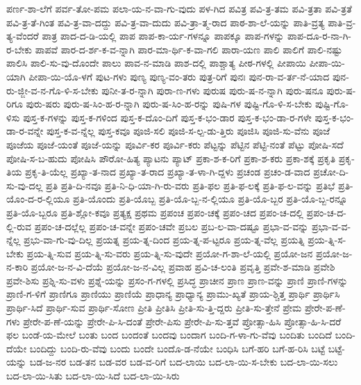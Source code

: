 {ಪರ್ಣ-ಶಾ-ಲೆಗೆ
ಪರ್ವ-ತೋ-ಪಮ
ಪಲಾ-ಯ-ನ-ವಾ-ಗು-ವುದು
ಪಳ-ಗಿದ
ಪವಿತ್ರ
ಪವಿ-ತ್ರ-ತಮ
ಪವಿ-ತ್ರತಾ
ಪವಿ-ತ್ರತೆ
ಪವಿ-ತ್ರ-ತೆ-ಗಿಂತ
ಪವಿ-ತ್ರ-ವಾ-ದದ್ದು
ಪವಿ-ತ್ರ-ವಾ-ದುದು
ಪವಿ-ತ್ರಾ-ತ್ಮ-ರಾದ
ಪಾಠ-ಶಾ-ಲೆ-ಯನ್ನು
ಪಾತಿ-ವ್ರತ್ಯ
ಪಾತಿ-ವ್ರ-ತ್ಯ-ವೆಂದರೆ
ಪಾತ್ರ
ಪಾದ-ದ-ಡಿ-ಯಲ್ಲಿ
ಪಾಪ
ಪಾಪ-ಕಾ-ರ್ಯ-ಗಳನ್ನೂ
ಪಾಪಕ್ಕೂ
ಪಾಪ-ಗಳನ್ನು
ಪಾಪ-ದೂ-ರ-ನಾ-ಗಿ-ರ-ಬೇಕು
ಪಾಪವೆ
ಪಾರ-ದ-ರ್ಶ-ಕ-ವ-ನ್ನಾಗಿ
ಪಾರ-ಮಾ-ರ್ಥಿ-ಕ-ವಾ-ಗಲಿ
ಪಾರಾ-ಯಣ
ಪಾಲಿ
ಪಾಲಿಗೆ
ಪಾಲಿ-ನಷ್ಟು
ಪಾಲಿಸಿ
ಪಾಲಿ-ಸು-ವು-ದೊಂದೇ
ಪಾಲು
ಪಾವ-ನ-ಮಾಡಿ
ಪಾಶ-ದಲ್ಲಿ
ಪಾಶ್ಚಾತ್ಯ
ಪೀಠ-ಗಳಲ್ಲಿ
ಪೀಪಾಯಿ
ಪೀಪಾ-ಯಿ-ಯಾಗಿ
ಪೀಪಾ-ಯಿ-ಯೊ-ಳಗೆ
ಪುಟ-ಗಳು
ಪುಣ್ಯ
ಪುಣ್ಯ-ವಂ-ತರು
ಪುತ್ರ-ರಿಗೆ
ಪುನಃ
ಪುನ-ರಾ-ವ-ರ್ತ-ನೆ-ಯಾದ
ಪುನ-ರು-ಜ್ಜೀ-ವ-ನ-ಗೊ-ಳಿ-ಸ-ಬೇಕು
ಪುನೀ-ತ-ರ-ನ್ನಾಗಿ
ಪುರಾ-ಣ-ಗಳು
ಪುರುಷ
ಪುರು-ಷ-ನ-ನ್ನಾಗಿ
ಪುರು-ಷನೂ
ಪುರು-ಷ-ರಿಗೂ
ಪುರು-ಷರು
ಪುರು-ಷ-ಸಿಂ-ಹ-ರ-ನ್ನಾಗಿ
ಪುರು-ಷ-ಸಿಂ-ಹ-ರನ್ನು
ಪುಷಿ-ಗಳ
ಪುಷ್ಟಿ-ಗೊ-ಳಿ-ಸ-ಬೇಕು
ಪುಷ್ಟಿ-ಗೊ-ಳಿಸು
ಪುಸ್ತ-ಕ-ಗಳನ್ನು
ಪುಸ್ತ-ಕ-ಗಳಿಂದ
ಪುಸ್ತ-ಕ-ದೊಂ-ದಿಗೆ
ಪುಸ್ತ-ಕ-ಭಂ-ಡಾರ
ಪುಸ್ತ-ಕ-ಭಂ-ಡಾ-ರ-ಗಳೇ
ಪುಸ್ತ-ಕ-ಭಂ-ಡಾ-ರ-ವನ್ನೇ
ಪುಸ್ತ-ಕ-ವ-ನ್ನೆಲ್ಲ
ಪುಸ್ತ-ಕವೂ
ಪೂಜಿ-ಸಲಿ
ಪೂಜಿ-ಸ-ಲ್ಪ-ಡು-ತ್ತಿರು
ಪೂಜಿಸಿ
ಪೂಜಿ-ಸು-ವೆನು
ಪೂಜೆ
ಪೂಜೆಯ
ಪೂಜೆ-ಯಂತೆ
ಪೂಜೆ-ಯನ್ನು
ಪೂರ್ವಿ-ಕರ
ಪೂರ್ವಿ-ಕರು
ಪೆಟ್ಟನ್ನು
ಪೆಟ್ಟಿನ
ಪೆಟ್ಟಿ-ನಂತೆ
ಪೆಟ್ಟು
ಪೋಷಿ-ಸದೆ
ಪೋಷಿ-ಸ-ಬ-ಹುದು
ಪೋಷಿಸಿ
ಪೌರೋ-ಹಿತ್ಯ
ಪ್ಯಾಟನು
ಪ್ಯಾಟ್
ಪ್ರಕಾ-ಶ-ಕ-ರಿಗೆ
ಪ್ರಕಾ-ಶ-ಕರು
ಪ್ರಕಾ-ಶಕ್ಕೆ
ಪ್ರಕೃತಿ
ಪ್ರಕೃ-ತಿಯ
ಪ್ರಕೃ-ತಿ-ಯೆಲ್ಲ
ಪ್ರಖ್ಯಾ-ತ-ನಾದ
ಪ್ರಖ್ಯಾ-ತ-ರಾದ
ಪ್ರಖ್ಯಾ-ತ-ಳಾ-ಗಿ-ದ್ದಳು
ಪ್ರಚಂಡ
ಪ್ರಚಂ-ಡ-ವಾದ
ಪ್ರಚೋ-ದಿ-ಸು-ವು-ದಲ್ಲ
ಪ್ರತಿ
ಪ್ರತಿ-ದಿ-ನವೂ
ಪ್ರತಿ-ನಿ-ಧಿ-ಯಾ-ಗಿ-ರು-ವರು
ಪ್ರತಿ-ಫಲ
ಪ್ರತಿ-ಫ-ಲಕ್ಕೆ
ಪ್ರತಿ-ಫ-ಲ-ವನ್ನು
ಪ್ರತಿಭೆ
ಪ್ರತಿ-ಯೊಂ-ದ-ರ-ಲ್ಲಿಯೂ
ಪ್ರತಿ-ಯೊಂದು
ಪ್ರತಿ-ಯೊಬ್ಬ
ಪ್ರತಿ-ಯೊ-ಬ್ಬ-ನ-ಲ್ಲಿಯೂ
ಪ್ರತಿ-ಯೊ-ಬ್ಬರ
ಪ್ರತಿ-ಯೊ-ಬ್ಬ-ರನ್ನೂ
ಪ್ರತಿ-ಯೊ-ಬ್ಬರೂ
ಪ್ರತಿ-ಶ್ಲೋ-ಕವೂ
ಪ್ರತ್ಯಕ್ಷ
ಪ್ರಥಮ
ಪ್ರಪಂಚ
ಪ್ರಪಂ-ಚಕ್ಕೆ
ಪ್ರಪಂ-ಚದ
ಪ್ರಪಂ-ಚ-ದಲ್ಲಿ
ಪ್ರಪಂ-ಚ-ದ-ಲ್ಲಿ-ರುವ
ಪ್ರಪಂ-ಚ-ದಲ್ಲೆಲ್ಲ
ಪ್ರಪಂ-ಚ-ವನ್ನೇ
ಪ್ರಪಂ-ಚವೇ
ಪ್ರಬಲ
ಪ್ರಬ-ಲ-ವಾ-ದಷ್ಟೂ
ಪ್ರಭಾ-ವ-ವನ್ನು
ಪ್ರಭಾ-ವ-ವ-ನ್ನೆಲ್ಲ
ಪ್ರಭು-ವಾ-ಗು-ವು-ದಿಲ್ಲ
ಪ್ರಯತ್ನ
ಪ್ರಯ-ತ್ನ-ದಿಂದ
ಪ್ರಯ-ತ್ನ-ಪ-ಟ್ಟರೂ
ಪ್ರಯ-ತ್ನ-ವೆಲ್ಲ
ಪ್ರಯತ್ನಿ
ಪ್ರಯ-ತ್ನಿ-ಸ-ಬೇಕು
ಪ್ರಯ-ತ್ನಿ-ಸುವ
ಪ್ರಯ-ತ್ನಿ-ಸು-ವರು
ಪ್ರಯ-ತ್ನಿ-ಸು-ವುದೇ
ಪ್ರಯೋ-ಗ-ಶಾ-ಲೆ-ಯಲ್ಲಿ
ಪ್ರಯೋ-ಜನ
ಪ್ರಯೋ-ಜ-ನ-ಕಾರಿ
ಪ್ರಯೋ-ಜ-ನ-ವಿ-ದೆಯೆ
ಪ್ರಯೋ-ಜ-ನ-ವಿಲ್ಲ
ಪ್ರವಾಹ
ಪ್ರವಿ-ಚ-ಲಂತಿ
ಪ್ರವೃತ್ತಿ
ಪ್ರವೇ-ಶ-ಮಾಡಿ
ಪ್ರವೇಶಿ
ಪ್ರವೇ-ಶಿಸು
ಪ್ರಶ್ನಿ-ಸು-ವಳು
ಪ್ರಶ್ನೆ-ಯನ್ನು
ಪ್ರಸಂ-ಗ-ಗಳಲ್ಲಿ
ಪ್ರಸಿದ್ಧ
ಪ್ರಾಚೀನ
ಪ್ರಾಣ
ಪ್ರಾಣ-ವನ್ನು
ಪ್ರಾಣಿ
ಪ್ರಾಣಿ-ಗಳನ್ನು
ಪ್ರಾಣಿ-ಗ-ಳಿಗೆ
ಪ್ರಾಣಿಗೂ
ಪ್ರಾಣಿಯು
ಪ್ರಾಣಿಯೆ
ಪ್ರಾಧಾನ್ಯ
ಪ್ರಾಧ್ಯಾನ್ಯ
ಪ್ರಾಮು-ಖ್ಯತೆ
ಪ್ರಾಯ-ಶ್ಚಿತ್ತ
ಪ್ರಾರ್ಥಿ
ಪ್ರಾರ್ಥಿಸಿ
ಪ್ರಾರ್ಥಿ-ಸಿದೆ
ಪ್ರಾರ್ಥಿ-ಸುವ
ಪ್ರಾರ್ಥಿ-ಸೋಣ
ಪ್ರೀತಿ
ಪ್ರೀತಿಸಿ
ಪ್ರೀತಿ-ಸು-ತ್ತಿ-ದ್ದರು
ಪ್ರೀತಿ-ಸು-ತ್ತೇನೆ
ಪ್ರೇಮ
ಪ್ರೇರೇ-ಪ-ಣೆ-ಗಳು
ಪ್ರೇರೇ-ಪ-ಣೆ-ಯನ್ನು
ಪ್ರೇರೇ-ಪಿ-ಸಿ-ದಂತೆ
ಪ್ರೇರೇ-ಪಿಸು
ಪ್ರೇರೇ-ಪಿ-ಸು-ತ್ತವೆ
ಪ್ರೋತ್ಸಾ-ಹಿಸಿ
ಪ್ರೋತ್ಸಾ-ಹಿ-ಸಿ-ದರೆ
ಫಲ
ಬಂಡೆ-ಯ-ಮೇಲೆ
ಬಂತು
ಬಂದ
ಬಂದಂತೆ
ಬಂದವು
ಬಂದಾಗ
ಬಂದಿ-ಗ-ಳಾ-ಗು-ವೆವು
ಬಂದಿತು
ಬಂದಿದೆ
ಬಂದಿ-ದೆಯೇ
ಬಂದಿದ್ದು
ಬಂದಿ-ರು-ವೆವು
ಬಂದು
ಬಂದೇ
ಬಂದೊ-ಡ-ನೆಯೇ
ಬಂಧಿಸಿ
ಬಗೆ-ಹರಿ
ಬಗೆ-ಹ-ರಿಸಿ
ಬಟ್ಟೆ
ಬಟ್ಟೆ-ಯನ್ನು
ಬಡ-ಜ-ನರ
ಬಡ-ತನ
ಬಡ-ವರ
ಬಡ-ವ-ರಿಗೆ
ಬದ-ಲಾಯಿ
ಬದ-ಲಾ-ಯಿ-ಸ-ಬೇಕು
ಬದ-ಲಾ-ಯಿ-ಸಲು
ಬದ-ಲಾ-ಯಿ-ಸಿತು
ಬದ-ಲಾ-ಯಿ-ಸಿದೆ
ಬದ-ಲಾ-ಯಿ-ಸಿರು
}

